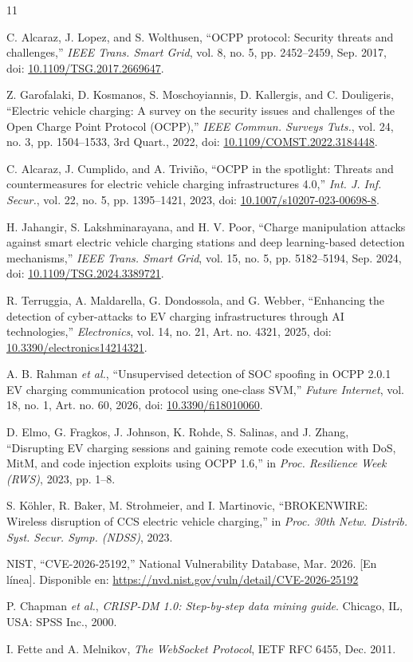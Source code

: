 \documentclass[conference]{IEEEtran}
\begin{document}
\FloatBarrier
\begin{thebibliography}{11}

C. Alcaraz, J. Lopez, and S. Wolthusen, ``OCPP protocol: Security threats and challenges,'' \textit{IEEE Trans. Smart Grid}, vol. 8, no. 5, pp. 2452--2459, Sep. 2017, doi: \url{10.1109/TSG.2017.2669647}.

Z. Garofalaki, D. Kosmanos, S. Moschoyiannis, D. Kallergis, and C. Douligeris, ``Electric vehicle charging: A survey on the security issues and challenges of the Open Charge Point Protocol (OCPP),'' \textit{IEEE Commun. Surveys Tuts.}, vol. 24, no. 3, pp. 1504--1533, 3rd Quart., 2022, doi: \url{10.1109/COMST.2022.3184448}.

C. Alcaraz, J. Cumplido, and A. Triviño, ``OCPP in the spotlight: Threats and countermeasures for electric vehicle charging infrastructures 4.0,'' \textit{Int. J. Inf. Secur.}, vol. 22, no. 5, pp. 1395--1421, 2023, doi: \url{10.1007/s10207-023-00698-8}.

H. Jahangir, S. Lakshminarayana, and H. V. Poor, ``Charge manipulation attacks against smart electric vehicle charging stations and deep learning-based detection mechanisms,'' \textit{IEEE Trans. Smart Grid}, vol. 15, no. 5, pp. 5182--5194, Sep. 2024, doi: \url{10.1109/TSG.2024.3389721}.

R. Terruggia, A. Maldarella, G. Dondossola, and G. Webber, ``Enhancing the detection of cyber-attacks to EV charging infrastructures through AI technologies,'' \textit{Electronics}, vol. 14, no. 21, Art. no. 4321, 2025, doi: \url{10.3390/electronics14214321}.

A. B. Rahman \textit{et al.}, ``Unsupervised detection of SOC spoofing in OCPP 2.0.1 EV charging communication protocol using one-class SVM,'' \textit{Future Internet}, vol. 18, no. 1, Art. no. 60, 2026, doi: \url{10.3390/fi18010060}.

D. Elmo, G. Fragkos, J. Johnson, K. Rohde, S. Salinas, and J. Zhang, ``Disrupting EV charging sessions and gaining remote code execution with DoS, MitM, and code injection exploits using OCPP 1.6,'' in \textit{Proc. Resilience Week (RWS)}, 2023, pp. 1--8.

S. Köhler, R. Baker, M. Strohmeier, and I. Martinovic, ``BROKENWIRE: Wireless disruption of CCS electric vehicle charging,'' in \textit{Proc. 30th Netw. Distrib. Syst. Secur. Symp. (NDSS)}, 2023.

NIST, ``CVE-2026-25192,'' National Vulnerability Database, Mar. 2026. [En línea]. Disponible en: \url{https://nvd.nist.gov/vuln/detail/CVE-2026-25192}

P. Chapman \textit{et al.}, \textit{CRISP-DM 1.0: Step-by-step data mining guide}. Chicago, IL, USA: SPSS Inc., 2000.

I. Fette and A. Melnikov, \textit{The WebSocket Protocol}, IETF RFC 6455, Dec. 2011.

\end{thebibliography}
\end{document}
